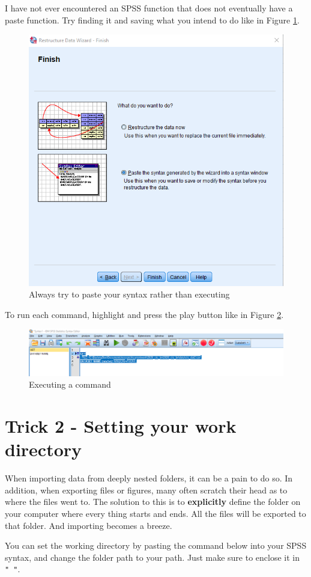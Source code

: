 \documentclass[
]{book}
\begin{document}
I have not ever encountered an SPSS function that does not eventually have a paste function. Try finding it and saving what you intend to do like in Figure \ref{fig:paste-syntax2}.

\begin{figure}
\includegraphics[width=0.5\linewidth]{images/paste_syntax2} \caption{Always try to paste your syntax rather than executing}\label{fig:paste-syntax2}
\end{figure}

To run each command, highlight and press the play button like in Figure \ref{fig:play}.

\begin{figure}
\includegraphics[width=0.8\linewidth]{images/run_syntax} \caption{Executing a command}\label{fig:play}
\end{figure}

\hypertarget{trick2}{%
\chapter{Trick 2 - Setting your work directory}\label{trick2}}

When importing data from deeply nested folders, it can be a pain to do so. In addition, when exporting files or figures, many often scratch their head as to where the files went to. The solution to this is to \textbf{explicitly} define the folder on your computer where every thing starts and ends. All the files will be exported to that folder. And importing becomes a breeze.

You can set the working directory by pasting the command below into your SPSS syntax, and change the folder path to your path. Just make sure to enclose it in \texttt{"\ "}.
\end{document}
